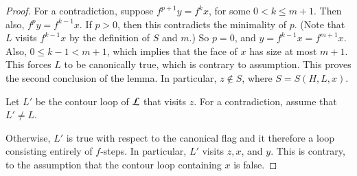 \begin{proof} 
%
%
%
  For a contradiction, suppose $f^{p+1} y = f^k x$, for some $0<k\le
  m+1$.  Then also, $f^p y = f^{k-1} x$.  If $p>0$, then this
  contradicts the minimality of $p$.   (Note that $L$ visits $f^{k-1}x$ by the
definition of $S$ and $m$.)  So $p=0$, and $y=f^{k-1} x =
  f^{m+1} x$.  Also, $0\le k-1 < {m+1}$, which implies that the face of $x$ has size at
most $m+1$.  This  forces $L$ to be canonically true, which is contrary to assumption.  This proves the second
  conclusion of the lemma.  In particular, $z\not\in S$, where $S =
  S(H,L,x)$.

Let $L'$ be the contour loop of ${\cal L}$ that visits $z$.  For a contradiction,
assume that $L'\ne L$.

  Otherwise, $L'$ is true with respect to the
canonical flag and it therefore a loop consisting entirely of
$f$-steps.  In particular, $L'$ visits $z,x$, and $y$.  This is
contrary, to the assumption that the contour loop containing $x$ is
false.


\end{proof}
